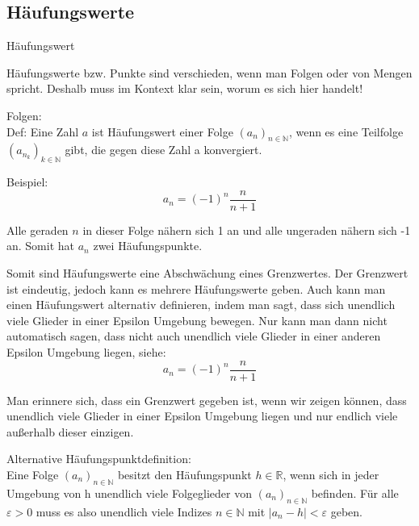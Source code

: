 \documentclass[smallheadings,headsepline,12pt,a4paper]{scrartcl}
\begin{document}
\newpage

\subsection*{Häufungswerte}


\begin{center}
\item[Häufungswert]
\end{center}
\item Häufungswerte bzw. Punkte sind verschieden, wenn man Folgen oder von Mengen spricht. Deshalb muss im Kontext klar sein, worum es sich hier handelt! \\
\item Folgen: \\

Def: Eine Zahl $a$ ist Häufungswert einer Folge $(a_n)_{n\in \mathbb{N}}$, wenn es eine Teilfolge $(a_{n_k} )_{k\in \mathbb{N}}$ gibt, die gegen diese Zahl a konvergiert. \\

\item Beispiel: \\
$$ a_n= (-1)^n \frac{n}{n+1} $$ 

Alle geraden $n$ in dieser Folge nähern sich 1 an und alle ungeraden nähern sich -1 an. Somit hat $a_n$ zwei Häufungspunkte.

\item Somit sind Häufungswerte eine Abschwächung eines Grenzwertes. Der Grenzwert ist eindeutig, jedoch kann es mehrere Häufungswerte geben. Auch kann man einen Häufungswert alternativ definieren, indem man sagt, dass sich unendlich viele Glieder in einer Epsilon Umgebung bewegen. Nur kann man dann nicht automatisch sagen, dass nicht auch unendlich viele Glieder in einer anderen Epsilon Umgebung liegen, siehe: \\ 



$$ a_n= (-1)^n \frac{n}{n+1} $$ 

Man erinnere sich, dass ein Grenzwert gegeben ist, wenn wir zeigen können, dass unendlich viele Glieder in einer Epsilon Umgebung liegen und nur endlich viele außerhalb dieser einzigen. \\

\item Alternative Häufungspunktdefinition: \\

Eine Folge $(a_n)_{n\in \mathbb{N}}$ besitzt den Häufungspunkt $h\in \mathbb{R}$, wenn sich in jeder Umgebung von h unendlich viele Folgeglieder von $(a_n)_{n \in \mathbb{N}} $ befinden. Für alle 
$ \varepsilon > 0 $ muss es also unendlich viele Indizes $ n \in \mathbb{N} $ mit $|a_n - h | < \varepsilon $ geben.
\end{document}
